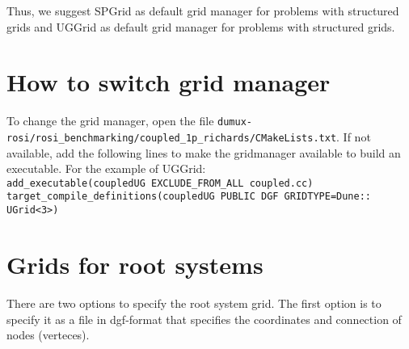 Thus, we suggest SPGrid as default grid manager for problems with structured grids and UGGrid as default grid manager for problems with structured grids. 

\section*{How to switch grid manager}
To change the grid manager, open the file \lstinline{dumux-rosi/rosi_benchmarking/coupled_1p_richards/CMakeLists.txt}. If not available, add the following lines to make the gridmanager available to build an executable. For the example of UGGrid:\\

\lstinline{add_executable(coupledUG EXCLUDE_FROM_ALL coupled.cc)}\\
\lstinline{target_compile_definitions(coupledUG PUBLIC DGF GRIDTYPE=Dune:: UGrid<3>)}

\section*{Grids for root systems}

There are two options to specify the root system grid. The first option is to specify it as a file in dgf-format that specifies the coordinates and connection of nodes (verteces).  

